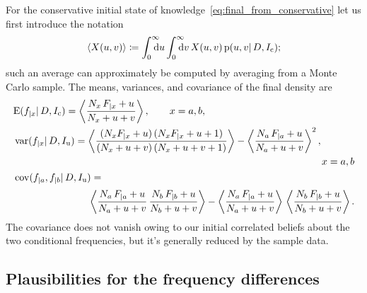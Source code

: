 \documentclass[\ifafour a4paper,12pt,\else a5paper,10pt,\fi%
onecolumn,oneside,article,%
british%
]{memoir}
\theoremstyle{remark}
\theoremstyle{innote}
\newcommand*{\di}{\mathrm{d}}%
\newcommand*{\defd}{\coloneqq}
\newcommand*{\pf}{\mathrm{p}}%
\renewcommand*{\|}{\mathpunct{|}}
\newcommand*{\E}{\mathrm{E}}
\DeclarePairedDelimiter\expp{(}{)}
\newcommand*{\expe}{\E\expp}%
\DeclareMathOperator{\cov}{cov}
\DeclareMathOperator{\var}{var}
\newcommand*{\yD}{D}
\newcommand*{\yI}{I}
\newcommand*{\yIu}{\yI_\text{u}}
\newcommand*{\yIc}{\yI_\text{c}}
\newcommand*{\ya}{a}
\newcommand*{\yb}{b}
\newcommand*{\yua}{u}
\newcommand*{\yub}{v}
\newcommand*{\uav}[1]{\left\langle #1 \right\rangle}
\begin{document}
For the conservative initial state of
knowledge~\eqref{eq:final_from_conservative} let us first introduce the
notation
\begin{equation}
  \label{eq:notation_avg_parameters}
  \uav{X(\yua,\yub)} \defd
      \int_{\mathrlap{0}}^{\mathrlap{\infty}}\di\yua
    \int_{\mathrlap{0}}^{\mathrlap{\infty}}\di\yub\,
X(\yua,\yub) \, \pf(\yua,\yub \| \yD,\yIc);
\end{equation}
such an average can approximately be computed by averaging from a Monte
Carlo sample. The means, variances, and covariance of the final density are
\begin{subequations}
  \label{eq:stats_final_conserv}
  \begin{align}
    \label{eq:mean_final_conserv}
    &\expe{f_{|x} \| \yD, \yIc} =
                                 \uav{\frac{N_{x}\,F_{|x}+\yua}{N_{x}+\yua+\yub}},
                                 \qquad x=\ya,\yb,
\\
  \label{eq:var_final_conserv}
    &\!\begin{multlined}[\linewidth]
\var(f_{|x} \| \yD, \yIu) =
  \uav{\frac{(N_{x}F_{|x}+\yua)\,(N_{x}F_{|x}+\yua+1)}{(N_{x}+\yua+\yub)\,(N_{x}+\yua+\yub+1)}}
  -
  \uav{\frac{N_{\ya}\,F_{|\ya}+\yua}{N_{\ya}+\yua+\yub}}^2,
  \\ x=\ya,\yb  
\end{multlined}
    \\
    \label{eq:cov_final_conserv}
&\!\begin{multlined}[\linewidth]
    \cov(f_{|\ya}, f_{|\yb} \| \yD, \yIu) ={}\\[\jot]
    \uav{\frac{N_{\ya}\,F_{|\ya}+\yua}{N_{\ya}+\yua+\yub}\,
      \frac{N_{\yb}\,F_{|\yb}+\yua}{N_{\yb}+\yua+\yub}}
    -
    \uav{\frac{N_{\ya}\,F_{|\ya}+\yua}{N_{\ya}+\yua+\yub}}\,
    \uav{\frac{N_{\yb}\,F_{|\yb}+\yua}{N_{\yb}+\yua+\yub}}.
  \end{multlined}
  \end{align}
\end{subequations}
The covariance does not vanish owing to our initial correlated beliefs
about the two conditional frequencies, but it's generally reduced by the
sample data.

\subsection{Plausibilities for the frequency differences}
\label{sec:p_df}
\end{document}
